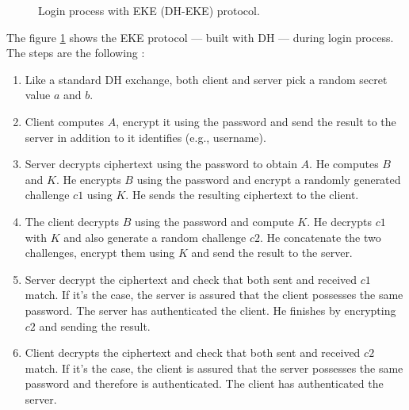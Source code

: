 \documentclass[../report.tex]{subfiles}
\begin{document}
\begin{figure}[h]
 \centering

 \setlength{\fboxsep}{10pt}
 \setlength{\fboxrule}{1pt}

 \caption{Login process with EKE (DH-EKE) protocol.}
 \label{fig:EKE_DH}
\end{figure}

The figure \ref{fig:EKE_DH} shows the EKE protocol --- built with DH ---  during login process.
The steps are the following :

\begin{enumerate}
 \item Like a standard DH exchange, both client and server pick a random secret value $a$ and $b$.
 \item Client computes $A$, encrypt it using the password and send the result to the server in addition to it identifies (e.g., username).
 \item Server decrypts ciphertext using the password to obtain $A$. He computes $B$ and $K$. He encrypts $B$ using the password and encrypt a randomly generated challenge $c1$ using $K$. He sends the resulting ciphertext to the client.
 \item The client decrypts $B$ using the password and compute $K$. He decrypts $c1$ with $K$ and also generate a random challenge $c2$. He concatenate the two challenges, encrypt them using $K$ and send the result to the server.
 \item Server decrypt the ciphertext and check that both sent and received $c1$ match. If it's the case, the server is assured that the client possesses the same password. The server has authenticated the client. He finishes by encrypting $c2$ and sending the result.
 \item Client decrypts the ciphertext and check that both sent and received $c2$ match. If it's the case, the client is assured that the server possesses the same password and therefore is authenticated. The client has authenticated the server.
\end{enumerate}
\end{document}
